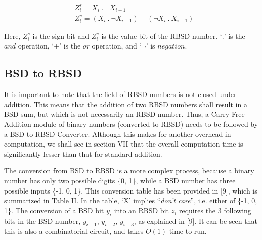\documentclass[conference]{IEEEtran}
\begin{document}
\vspace{-1em}
\begin{align}
&Z_{i}^{s} = X_{i} \ . \ \neg X_{i-1} \\
&Z_{i}^{v} = (X_{i} \ . \ \neg X_{i-1}) + (\neg X_{i} \ . \ X_{i-1})
\end{align}

Here, $Z_{i}^{s}$ is the sign bit and $Z_{i}^{v}$  is the value bit of the RBSD number. `$.$' is the $and$ operation, `+' is the $or$ operation, and `$\neg$' is $negation$.

\subsection{BSD to RBSD}

It is important to note that the field of RBSD numbers is not closed under addition. This means that the addition of two RBSD numbers shall result in a BSD sum, but which is not necessarily an RBSD number. Thus, a Carry-Free Addition module of binary numbers (converted to RBSD) needs to be followed by a BSD-to-RBSD Converter. Although this makes for another overhead in computation, we shall see in section VII that the overall computation time is significantly lesser than that for standard addition.

The conversion from BSD to RBSD is a more complex process, because a binary number has only two possible digits \{0, 1\}, while a BSD number has three possible inputs \{-1, 0, 1\}. This conversion table has been provided in [9], which is summarized in Table II. In the table, `X' implies ``\textit{don't care}'', i.e. either of \{-1, 0, 1\}. The conversion of a BSD bit $y_{i}$ into an RBSD bit $z_{i}$ requires the 3 following bits in the BSD number, $y_{i-1}$, $y_{i-2}$, $y_{i-3}$, as explained in [9]. It can be seen that this is also a combinatorial circuit, and takes $O(1)$ time to run.
\end{document}
